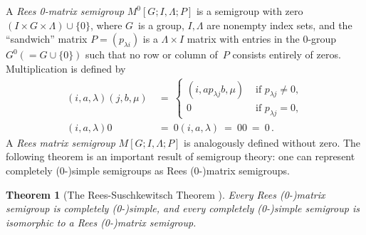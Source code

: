 \documentclass{lmcs}
\newtheorem{theorem}[thm]{Theorem}
\theoremstyle{definition}
\begin{document}
A \emph{Rees 0-matrix semigroup} $M^0[G; I, \Lambda; P]$ is a semigroup with zero $(I \times G \times \Lambda) \cup \{0\}$, where $G$~is a group, $I, \Lambda$ are nonempty index sets, and the ``sandwich'' matrix $P = (p_{\lambda i})$ is a $\Lambda \times I$ matrix with entries in the 0-group $G^0 (= G \cup \{0\})$ such that no row or column of~$P$ consists entirely of zeros.
Multiplication is defined by
\begin{align*}
  (i, a, \lambda) (j, b, \mu) \ &= \ \begin{cases} (i,a p_{\lambda j} b, \mu) & \text{ if } p_{\lambda j} \ne 0, \\
                                                   0                          & \text{ if } p_{\lambda j} = 0,
                                     \end{cases} \\
  (i,a,\lambda) 0 \ &= \ 0 (i,a,\lambda) \ = \ 0 0 \ = \ 0\,.   
\end{align*}
A \emph{Rees matrix semigroup} $M[G; I, \Lambda; P]$ is analogously defined without zero.
The following theorem is an important result of semigroup theory: one can represent completely \mbox{(0-)}simple semigroups as Rees \mbox{(0-)}matrix semigroups.
\begin{theorem}[The Rees-Suschkewitsch Theorem {\cite[Theorems 3.2.3 and 3.3.1]{Howie1995}}] \label{thm:Rees}
Every Rees \mbox{(0-)}matrix semigroup is completely \mbox{(0-)}simple, and every completely \mbox{(0-)}simple semigroup is isomorphic to a Rees \mbox{(0-)}matrix semigroup.
\end{theorem}
\end{document}
